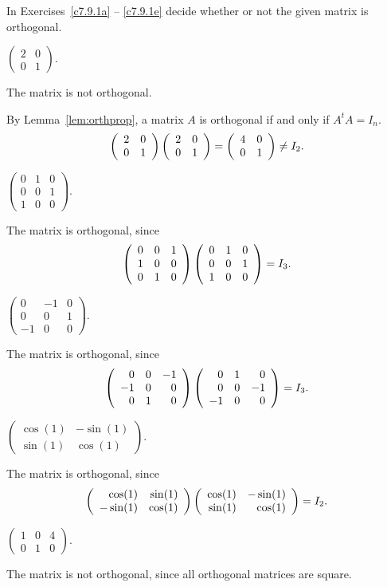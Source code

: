\documentclass{ximera}
\begin{document}
\noindent In Exercises~\ref{c7.9.1a} -- \ref{c7.9.1e} decide whether or not
the given matrix is orthogonal.
\begin{exercise} \label{c7.9.1a}
$\left(\begin{array}{rr} 2 & 0\\ 0 & 1\end{array}\right)$.

\begin{solution}
\ans The matrix is not orthogonal.

\soln By Lemma~\ref{lem:orthprop}, a matrix
$A$ is orthogonal if and only if $A^tA = I_n$.
\[
\left(\begin{array}{rr} 2 & 0\\ 0 &1\end{array}\right)\left(\begin{array}{rr} 2 & 0\\ 0 &1\end{array}\right) = \left(\begin{array}{rr} 4 & 0\\ 0 &1\end{array}\right) \neq I_2.
\]

\end{solution}
\end{exercise}
\begin{exercise} \label{c7.9.1b}
$\left(\begin{array}{rrr} 0 & 1 & 0\\ 0 & 0 & 1\\
1 & 0 & 0\end{array}\right)$.

\begin{solution}
\ans The matrix is orthogonal, since
\[
\left(\begin{array}{rrr} 0 & 0 & 1 \\ 1 & 0 & 0 \\ 0 & 1 & 0\end{array}\right)
\left(\begin{array}{rrr} 0 & 1 & 0 \\ 0 & 0 & 1 \\ 1 & 0 & 0\end{array}\right) =
I_3.
\]

\end{solution}
\end{exercise}
\begin{exercise} \label{c7.9.1c}
$\left(\begin{array}{rrr} 0 & -1 & 0\\ 0 & 0 & 1\\
-1 & 0 & 0\end{array}\right)$.

\begin{solution}
\ans The matrix is orthogonal, since
\[
\left(\begin{array}{rrr} 0 & 0 & -1 \\ -1 & 0 & 0 \\ 0 & 1 & 0\end{array}\right)
\left(\begin{array}{rrr} 0 & 1 & 0 \\ 0 & 0 & -1 \\ -1 & 0 & 0\end{array}\right) =
I_3.
\]

\end{solution}
\end{exercise}
\begin{exercise} \label{c7.9.1d}
$\left(\begin{array}{rr} \cos(1) & -\sin(1)\\ \sin(1) & \cos(1)
\end{array}\right)$.

\begin{solution}
\ans The matrix is orthogonal, since
\[
\left(\begin{array}{rr} \cos(1) & \sin(1)\\ -\sin(1) &\cos(1)\end{array}\right)
\left(\begin{array}{rr} \cos(1) & -\sin(1)\\ \sin(1) &\cos(1)\end{array}\right)
= I_2.
\]

\end{solution}
\end{exercise}
\begin{exercise} \label{c7.9.1e}
$\left(\begin{array}{rrr} 1 & 0 & 4\\ 0 & 1 & 0
\end{array}\right)$.

\begin{solution}
\ans The matrix is not orthogonal, since all orthogonal matrices
are square.

\end{solution}
\end{exercise}
\end{document}
